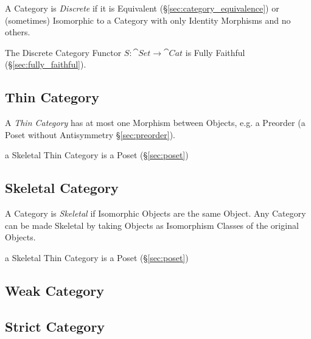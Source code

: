 A Category is \emph{Discrete} if it is Equivalent
(\S\ref{sec:category_equivalence}) or (sometimes) Isomorphic to a
Category with only Identity Morphisms and no others.

The Discrete Category Functor $S : \cat{Set} \rightarrow
\cat{Cat}$ is Fully Faithful (\S\ref{sec:fully_faithful}).



\subsection{Thin Category}\label{sec:thin_category}

A \emph{Thin Category} has at most one Morphism between Objects, e.g.
a Preorder (a Poset without Antisymmetry \S\ref{sec:preorder}).

a Skeletal Thin Category is a Poset (\S\ref{sec:poset})



\subsection{Skeletal Category}\label{sec:skeletal_category}

A Category is \emph{Skeletal} if Isomorphic Objects are the same
Object. Any Category can be made Skeletal by taking Objects as
Isomorphism Classes of the original Objects.

a Skeletal Thin Category is a Poset (\S\ref{sec:poset})



\subsection{Weak Category}\label{sec:weak_category}

\subsection{Strict Category}\label{sec:strict_category}

